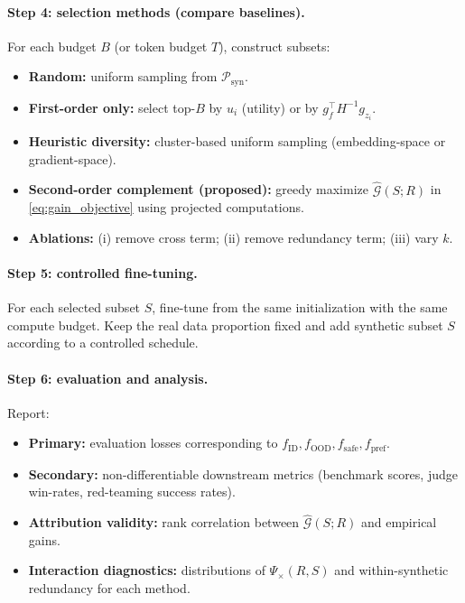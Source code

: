\documentclass{article}
\theoremstyle{plain}
\theoremstyle{definition}
\theoremstyle{remark}
\begin{document}
\paragraph{Step 4: selection methods (compare baselines).}
For each budget $B$ (or token budget $T$), construct subsets:
\begin{itemize}
  \item \textbf{Random:} uniform sampling from $\mathcal{P}_{\mathrm{syn}}$.
  \item \textbf{First-order only:} select top-$B$ by $u_i$ (utility) or by $g_f^\top H^{-1} g_{z_i}$.
  \item \textbf{Heuristic diversity:} cluster-based uniform sampling (embedding-space or gradient-space).
  \item \textbf{Second-order complement (proposed):} greedy maximize $\widehat{\mathcal{G}}(S;R)$ in \eqref{eq:gain_objective}
  using projected computations.
  \item \textbf{Ablations:} (i) remove cross term; (ii) remove redundancy term; (iii) vary $k$.
\end{itemize}

\paragraph{Step 5: controlled fine-tuning.}
For each selected subset $S$, fine-tune from the same initialization with the same compute budget.
Keep the real data proportion fixed and add synthetic subset $S$ according to a controlled schedule.

\paragraph{Step 6: evaluation and analysis.}
Report:
\begin{itemize}
  \item \textbf{Primary:} evaluation losses corresponding to $f_{\mathrm{ID}}, f_{\mathrm{OOD}}, f_{\mathrm{safe}}, f_{\mathrm{pref}}$.
  \item \textbf{Secondary:} non-differentiable downstream metrics (benchmark scores, judge win-rates, red-teaming success rates).
  \item \textbf{Attribution validity:} rank correlation between $\widehat{\mathcal{G}}(S;R)$ and empirical gains.
  \item \textbf{Interaction diagnostics:} distributions of $\Psi_{\times}(R,S)$ and within-synthetic redundancy for each method.
\end{itemize}
\end{document}
